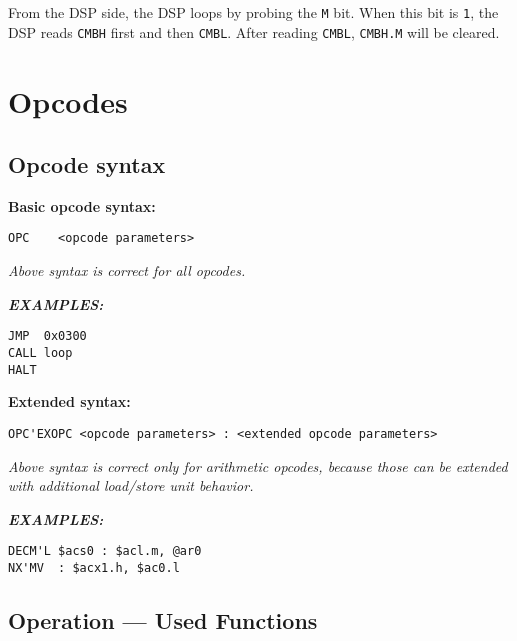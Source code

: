 \documentclass[oneside,english,a4paper,10pt,oneside,openany,final]{memoir}
\newcommand{\Register}[1]{\texttt{#1}}
\newcommand{\RegisterField}[1]{\texttt{#1}}
\newcommand{\Value}[1]{\texttt{#1}}
\begin{document}
From the DSP side, the DSP loops by probing the \RegisterField{M} bit. When this bit is \Value{1}, the DSP reads \Register{CMBH} first and then \Register{CMBL}.
After reading \Register{CMBL}, \RegisterField{CMBH.M} will be cleared.

\pagebreak{}

\chapter{Opcodes}

\section{Opcode syntax}

\vspace{3mm}
\textbf{Basic opcode syntax:}

\begin{lstlisting}[basicstyle=\ttfamily]
OPC    <opcode parameters>
\end{lstlisting}

\textit{Above syntax is correct for all opcodes.}
\vspace{5mm}

\textbf{\textit{EXAMPLES:}}
\begin{lstlisting}[basicstyle=\ttfamily]
JMP  0x0300
CALL loop
HALT
\end{lstlisting}

\vspace{5mm}

\textbf{Extended syntax:}

\begin{lstlisting}[basicstyle=\ttfamily]
OPC'EXOPC <opcode parameters> : <extended opcode parameters>
\end{lstlisting}

\textit{Above syntax is correct only for arithmetic opcodes, because those can be extended with additional load/store unit behavior.}
\vspace{5mm}

\textbf{\textit{EXAMPLES:}}
\begin{lstlisting}[basicstyle=\ttfamily]
DECM'L $acs0 : $acl.m, @ar0
NX'MV  : $acx1.h, $ac0.l
\end{lstlisting}

\pagebreak{}

\section{Operation --- Used Functions}
\end{document}
